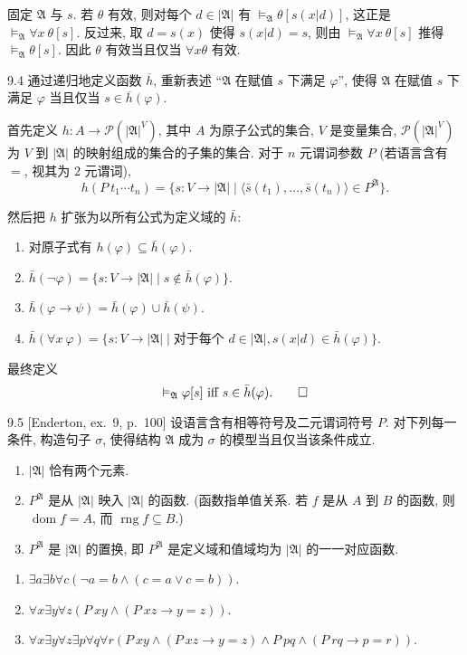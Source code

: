 固定 $\mathfrak{A}$ 与 $s$. 若 $\theta$ 有效, 则对每个 $d\in|\mathfrak{A}|$ 有 $\vDash_{\mathfrak{A}}\theta[s(x|d)]$, 这正是 $\vDash_{\mathfrak{A}}\forall x\ \theta[s]$. 反过来, 取 $d=s(x)$ 使得 $s(x|d)=s$, 则由 $\vDash_{\mathfrak{A}}\forall x\ \theta[s]$ 推得 $\vDash_{\mathfrak{A}}\theta[s]$. 因此 $\theta$ 有效当且仅当 $\forall x\theta$ 有效.

\begin{exercise}{9.4}
  通过递归地定义函数 $\overline{h}$, 重新表述 “$\mathfrak{A}$ 在赋值 $s$ 下满足 $\varphi$”, 使得 $\mathfrak{A}$ 在赋值 $s$ 下满足 $\varphi$ 当且仅当 $s\in\overline{h}(\varphi)$.
\end{exercise}

首先定义 $h:A\rightarrow \mathcal{P}(|\mathfrak{A}|^V)$, 其中 $A$ 为原子公式的集合, $V$ 是变量集合, $\mathcal{P}(|\mathfrak{A}|^V)$ 为 $V$ 到 $|\mathfrak A|$ 的映射组成的集合的子集的集合. 对于 $n$ 元谓词参数 $P$ (若语言含有 $=$, 视其为 $2$ 元谓词),
\[
  h(P\ t_1\cdots t_n)=\{s:V\rightarrow|\mathfrak{A}|\mid\langle\bar{s}(t_1),\dots,\bar{s}(t_n)\rangle\in P^{\mathfrak{A}}\}.
\]

然后把 $h$ 扩张为以所有公式为定义域的 $\bar{h}$:
\begin{enumerate}
  \item 对原子式有 $h(\varphi)\subseteq\bar{h}(\varphi)$.
  \item $\bar{h}(\neg \varphi)=\{s:V\rightarrow|\mathfrak{A}|\mid s\notin\bar{h}(\varphi)\}$.
  \item $\bar{h}(\varphi\rightarrow \psi)=\bar{h}(\varphi)\cup\bar{h}(\psi)$.
  \item $\bar{h}(\forall x\ \varphi)=\{s:V\rightarrow|\mathfrak{A}|\mid\text{对于每个 }d\in|\mathfrak{A}|, s(x|d)\in\bar{h}(\varphi)\}$.
\end{enumerate}
最终定义
\[
  \vDash_{\mathfrak{A}}\varphi[s]\text{ iff }s\in\bar{h}(\varphi).\qedhere
\]

\begin{exercise}{9.5}
  [Enderton, ex.~9, p.~100]
  设语言含有相等符号及二元谓词符号 $P$. 对下列每一条件, 构造句子 $\sigma$, 使得结构 $\mathfrak{A}$ 成为 $\sigma$ 的模型当且仅当该条件成立.
  \begin{enumerate}[label=(\alph*)]
    \item $|\mathfrak{A}|$ 恰有两个元素.
    \item $P^{\mathfrak{A}}$ 是从 $|\mathfrak{A}|$ 映入 $|\mathfrak{A}|$ 的函数. (函数指单值关系. 若 $f$ 是从 $A$ 到 $B$ 的函数, 则 $\operatorname{dom}f=A$, 而 $\operatorname{rng}f\subseteq B$.)
    \item $P^{\mathfrak{A}}$ 是 $|\mathfrak{A}|$ 的置换, 即 $P^{\mathfrak{A}}$ 是定义域和值域均为 $|\mathfrak{A}|$ 的一一对应函数.\qedhere
  \end{enumerate}
\end{exercise}

\begin{enumerate}
  \item $\exists a\exists b\forall c(\neg a=b\wedge(c=a\vee c=b))$.
  \item $\forall x\exists y\forall z(P\ xy\wedge(P\ xz\to y=z))$.
  \item $\forall x\exists y\forall z\exists p\forall q\forall r(P\ xy\wedge(P\ xz\to y=z)\wedge P\ pq\wedge(P\ rq\to p=r))$.
\end{enumerate}
